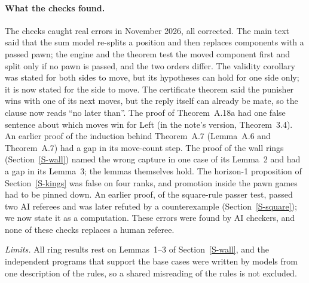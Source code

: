 \paragraph{What the checks found.}
The checks caught real errors in November 2026, all corrected. The main text said that the sum model re-splits a position and
then replaces components with a passed pawn; the engine and the theorem test the moved component first and split only if
no pawn is passed, and the two orders differ. The validity corollary was stated for both sides to move, but its
hypotheses can hold for one side only; it is now stated for the side to move. The certificate theorem said the punisher wins with one of its next moves, but the reply itself can
already be mate, so the clause now reads ``no later than''. The proof of Theorem~A.18a had one false sentence about which
moves win for Left (in the note's version, Theorem~3.4). An earlier proof of the induction behind Theorem~A.7 (Lemma~A.6 and Theorem~A.7) had a gap in its move-count step. The proof of the wall rings (Section~\ref{S-wall}) named the wrong capture in one case of its Lemma~2 and had a gap in its Lemma~3; the lemmas themselves hold. The horizon-1 proposition of Section~\ref{S-kings} was false on four ranks,
and promotion inside the pawn games had to be pinned down. An earlier proof, of the square-rule passer test, passed two AI
referees and was later refuted by a counterexample (Section~\ref{S-square}); we now state it as a computation.
These errors were found by AI checkers, and none of these checks replaces a human referee.

\emph{Limits.} All ring results rest on Lemmas~1--3 of Section~\ref{S-wall}, and the independent programs that support the
base cases were written by models from one description of the rules, so a shared misreading of the rules is not excluded.
